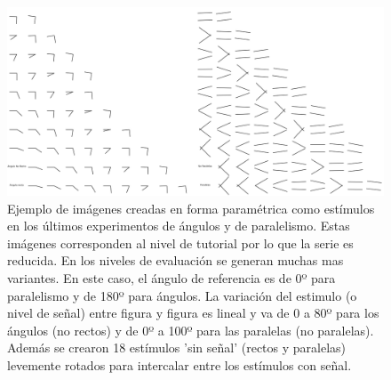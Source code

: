 \documentclass{article}
\numberwithin{figure}{section}
\begin{document}
        
    \begin{figure}
        \center
        \includegraphics[width=\textwidth]{Imagenes/Estimulos.png}
        \caption{Ejemplo de imágenes creadas en forma paramétrica como estímulos en los últimos experimentos de ángulos y de paralelismo. Estas imágenes corresponden al nivel de tutorial por lo que la serie es reducida. En los niveles de evaluación se generan muchas mas variantes. En este caso, el ángulo de referencia es de 0º para paralelismo y de 180º para ángulos. La variación del estimulo (o nivel de señal) entre figura y figura es lineal y va de 0 a 80º para los ángulos (no rectos) y de 0º a 100º para las paralelas (no paralelas). Además se crearon 18 estímulos 'sin señal' (rectos y paralelas) levemente rotados para intercalar entre los estímulos con señal.}
        \label{fig:Estimulos}
    \end{figure}
    
\end{document}
